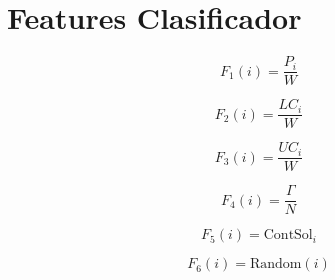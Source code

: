 \documentclass[spanish, a4paper, 12pt, openany,final]{book}
\begin{document}
\section{Features Clasificador}
\begin{multicols}{2}
	\label{eq:all_features}
	\begin{equation}
		F_1\left(i\right)   = \frac{P_i}{W}
		\label{feature:1}
	\end{equation}
	
	\begin{equation}
		F_2\left(i\right)   = \frac{LC_i}{W}
		\label{feature:2}
	\end{equation}
	
	\begin{equation}
		F_3\left(i\right)   = \frac{UC_i}{W}
		\label{feature:3}
	\end{equation}
	
	\begin{equation}
		F_4\left(i\right)   = \frac{\Gamma}{N}
		\label{feature:4}
	\end{equation}
	
	\begin{equation}
		F_5\left(i\right)   = \text{ContSol}_i
		\label{feature:5}
	\end{equation}
	
	\begin{equation}
		F_6\left(i\right)   = \text{Random}\left(i\right)
		\label{feature:6}
	\end{equation}
\end{multicols}

\clearpage
\end{document}
